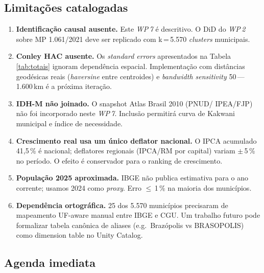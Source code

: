 \documentclass[12pt,a4paper,oneside]{article}
\begin{document}
\subsection{Limitações catalogadas}

\begin{enumerate}\itemsep3pt
\item \textbf{Identificação causal ausente.} Este \textit{WP\,7}
  é descritivo. O DiD do \textit{WP\,2} sobre MP 1.061/2021 deve ser
  replicado com k\,=\,5.570 \textit{clusters} municipais.
\item \textbf{Conley HAC ausente.} Os \textit{standard errors}
  apresentados na Tabela\,\ref{tab:totais} ignoram dependência espacial.
  Implementação com distâncias geodésicas reais (\textit{haversine} entre
  centroides) e \textit{bandwidth sensitivity} 50\,---\,1.600\,km é a
  próxima iteração.
\item \textbf{IDH-M não joinado.} O snapshot Atlas Brasil 2010 (PNUD/
  IPEA/FJP) não foi incorporado neste \textit{WP\,7}. Inclusão permitirá
  curva de Kakwani municipal e índice de necessidade.
\item \textbf{Crescimento real usa um único deflator nacional.} O
  IPCA acumulado 41{,}5\,\% é nacional; deflatores regionais
  (IPCA/RM por capital) variam $\pm$\,5\,\% no período. O efeito é
  conservador para o ranking de crescimento.
\item \textbf{População 2025 aproximada.} IBGE não publica
  estimativa para o ano corrente; usamos 2024 como \textit{proxy}. Erro
  $\leq$\,1\,\% na maioria dos municípios.
\item \textbf{Dependência ortográfica.} 25 dos 5.570 municípios
  precisaram de mapeamento UF-aware manual entre IBGE e CGU. Um trabalho
  futuro pode formalizar tabela canônica de aliases (e.g.\ Brazópolis vs
  BRASOPOLIS) como dimension table no Unity Catalog.
\end{enumerate}

\subsection{Agenda imediata}
\end{document}
